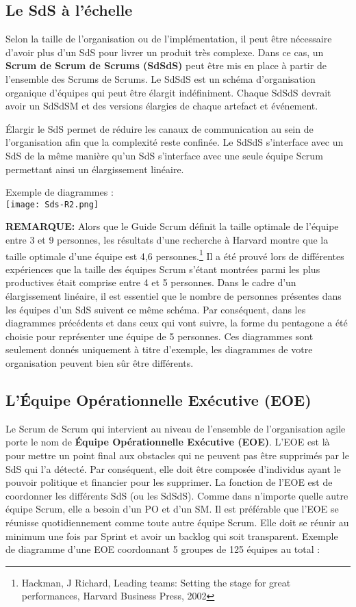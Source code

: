 \documentclass[french,12pt,a4paper,parskip=full]{scrartcl}
\begin{document}
\subsection{Le SdS à l'échelle}
Selon la taille de l'organisation ou de l'implémentation, il peut être nécessaire d'avoir plus
d'un SdS pour livrer un produit très complexe. Dans ce cas, un \textbf{Scrum de Scrum de
Scrums (SdSdS)} peut être mis en place à partir de l'ensemble des Scrums de Scrums. Le
SdSdS est un schéma d'organisation organique d'équipes qui peut être élargit
indéfiniment. Chaque SdSdS devrait avoir un SdSdSM et des versions élargies de chaque
artefact et événement.

Élargir le SdS permet de réduire les canaux de communication au sein de l'organisation
afin que la complexité reste confinée. Le SdSdS s'interface avec un SdS de la même
manière qu'un SdS s'interface avec une seule équipe Scrum permettant ainsi un
élargissement linéaire.

\pagebreak
Exemple de diagrammes :\\

\texttt{[image: Sds-R2.png]}

\textbf{\textsc{REMARQUE:}} Alors que le Guide Scrum définit la taille optimale de l'équipe entre 3 et 9
personnes, les résultats d'une recherche à Harvard montre que la taille optimale d'une
équipe est 4,6 personnes.\footnote{Hackman, J Richard, Leading teams: Setting the stage for
great performances, Harvard Business Press, 2002} Il a été prouvé lors de différentes expériences que la taille des
équipes Scrum s'étant montrées parmi les plus productives était comprise entre 4 et 5
personnes. Dans le cadre d'un élargissement linéaire, il est essentiel que le nombre de
personnes présentes dans les équipes d'un SdS suivent ce même schéma. Par
conséquent, dans les diagrammes précédents et dans ceux qui vont suivre, la forme du
pentagone a été choisie pour représenter une équipe de 5 personnes. Ces diagrammes
sont seulement donnés uniquement à titre d'exemple, les diagrammes de votre
organisation peuvent bien sûr être différents.

\subsection{L'Équipe Opérationnelle Exécutive (EOE)}
Le Scrum de Scrum qui intervient au niveau de l'ensemble de l'organisation agile porte le
nom de \textbf{Équipe Opérationnelle Exécutive (EOE)}. L'EOE est là pour mettre un point final
aux obstacles qui ne peuvent pas être supprimés par le SdS qui l'a détecté. Par
conséquent, elle doit être composée d'individus ayant le pouvoir politique et financier pour
les supprimer. La fonction de l'EOE est de coordonner les différents SdS (ou les SdSdS).
Comme dans n'importe quelle autre équipe Scrum, elle a besoin d'un PO et d'un SM. Il est
préférable que l'EOE se réunisse quotidiennement comme toute autre équipe Scrum. Elle
doit se réunir au minimum une fois par Sprint et avoir un backlog qui soit transparent.
Exemple de diagramme d'une EOE coordonnant 5 groupes de 125 équipes au total :
\end{document}
